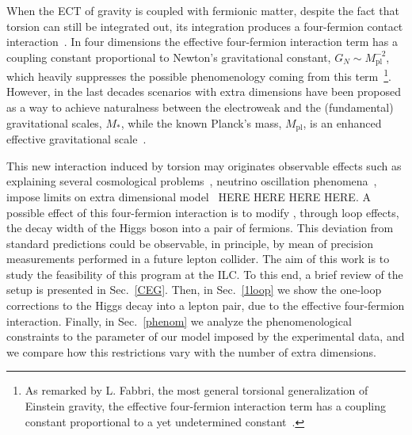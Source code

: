 \documentclass[twocolumn,aps,prd,showkeys,showpacs,groupedaddress]{revtex4-1}
\begin{document}
When the ECT of gravity is coupled with fermionic matter, despite the fact that torsion can still be integrated out, its integration produces a four-fermion contact interaction~\cite{Kibble:1961ba,RevModPhys.48.393,Shapiro:2001rz,SUGRA-book,Castillo-Felisola:2013jva}. In four dimensions the effective four-fermion interaction term has a coupling constant proportional to Newton's gravitational constant, $G_N\sim M_{\text{pl}}^{-2}$, which heavily suppresses the possible phenomenology coming from this term~\footnote{As remarked by L. Fabbri, the most general torsional generalization of Einstein gravity, the effective four-fermion interaction term has a coupling constant proportional to a yet undetermined constant~\cite{Fabbri:2011kq}.}. However, in the last decades scenarios with extra dimensions have been proposed as a way to achieve naturalness between the electroweak and the (fundamental) gravitational scales, $M_*$, while the known Planck's mass, $M_{\text{pl}}$, is an enhanced effective gravitational scale~\cite{ADD1,*AADD,*ADD2,RS1,*RS2}.



This new interaction induced by torsion may originates observable effects such as explaining several cosmological problems~\cite{Poplawski:2010jv,*Poplawski:2010kb,*Poplawski:2011xf,*Poplawski:2011wj,*Fabbri:2012yg}, neutrino oscillation phenomena~\cite{Capozziello:2013dja}, impose limits on extra dimensional model~\cite{Chang:2000yw,*Lebedev:2002dp,*Castillo-Felisola:2014iia,*Castillo-Felisola:2014xba} HERE HERE HERE HERE. A possible  effect of this four-fermion interaction is to modify , through loop effects, the decay width of the Higgs boson into a pair of fermions. This deviation from standard predictions could be observable, in principle, by mean of precision measurements performed in a future lepton collider. The  aim of this work is to study the feasibility of this program at the ILC. To this end, a brief review of the setup is presented in Sec.~\ref{CEG}. Then, in Sec.~\ref{1loop} we show the one-loop corrections to the Higgs decay into a lepton pair, due to the effective four-fermion interaction. Finally, in Sec.~\ref{phenom} we analyze the phenomenological constraints to the parameter of our model imposed by the experimental data, and we compare how this restrictions vary with the number of extra dimensions.
\end{document}

